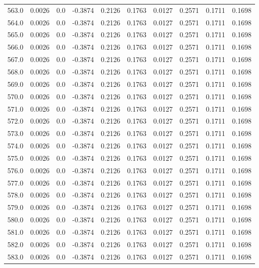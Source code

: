 \begin{longtable}{lrrrrrrrrr}
563.0 & 0.0026 & 0.0 & -0.3874 & 0.2126 & 0.1763 & 0.0127 & 0.2571 & 0.1711 & 0.1698 \\
564.0 & 0.0026 & 0.0 & -0.3874 & 0.2126 & 0.1763 & 0.0127 & 0.2571 & 0.1711 & 0.1698 \\
565.0 & 0.0026 & 0.0 & -0.3874 & 0.2126 & 0.1763 & 0.0127 & 0.2571 & 0.1711 & 0.1698 \\
566.0 & 0.0026 & 0.0 & -0.3874 & 0.2126 & 0.1763 & 0.0127 & 0.2571 & 0.1711 & 0.1698 \\
567.0 & 0.0026 & 0.0 & -0.3874 & 0.2126 & 0.1763 & 0.0127 & 0.2571 & 0.1711 & 0.1698 \\
568.0 & 0.0026 & 0.0 & -0.3874 & 0.2126 & 0.1763 & 0.0127 & 0.2571 & 0.1711 & 0.1698 \\
569.0 & 0.0026 & 0.0 & -0.3874 & 0.2126 & 0.1763 & 0.0127 & 0.2571 & 0.1711 & 0.1698 \\
570.0 & 0.0026 & 0.0 & -0.3874 & 0.2126 & 0.1763 & 0.0127 & 0.2571 & 0.1711 & 0.1698 \\
571.0 & 0.0026 & 0.0 & -0.3874 & 0.2126 & 0.1763 & 0.0127 & 0.2571 & 0.1711 & 0.1698 \\
572.0 & 0.0026 & 0.0 & -0.3874 & 0.2126 & 0.1763 & 0.0127 & 0.2571 & 0.1711 & 0.1698 \\
573.0 & 0.0026 & 0.0 & -0.3874 & 0.2126 & 0.1763 & 0.0127 & 0.2571 & 0.1711 & 0.1698 \\
574.0 & 0.0026 & 0.0 & -0.3874 & 0.2126 & 0.1763 & 0.0127 & 0.2571 & 0.1711 & 0.1698 \\
575.0 & 0.0026 & 0.0 & -0.3874 & 0.2126 & 0.1763 & 0.0127 & 0.2571 & 0.1711 & 0.1698 \\
576.0 & 0.0026 & 0.0 & -0.3874 & 0.2126 & 0.1763 & 0.0127 & 0.2571 & 0.1711 & 0.1698 \\
577.0 & 0.0026 & 0.0 & -0.3874 & 0.2126 & 0.1763 & 0.0127 & 0.2571 & 0.1711 & 0.1698 \\
578.0 & 0.0026 & 0.0 & -0.3874 & 0.2126 & 0.1763 & 0.0127 & 0.2571 & 0.1711 & 0.1698 \\
579.0 & 0.0026 & 0.0 & -0.3874 & 0.2126 & 0.1763 & 0.0127 & 0.2571 & 0.1711 & 0.1698 \\
580.0 & 0.0026 & 0.0 & -0.3874 & 0.2126 & 0.1763 & 0.0127 & 0.2571 & 0.1711 & 0.1698 \\
581.0 & 0.0026 & 0.0 & -0.3874 & 0.2126 & 0.1763 & 0.0127 & 0.2571 & 0.1711 & 0.1698 \\
582.0 & 0.0026 & 0.0 & -0.3874 & 0.2126 & 0.1763 & 0.0127 & 0.2571 & 0.1711 & 0.1698 \\
583.0 & 0.0026 & 0.0 & -0.3874 & 0.2126 & 0.1763 & 0.0127 & 0.2571 & 0.1711 & 0.1698 \\

\end{longtable}
